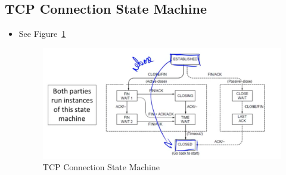 \documentclass[12pt]{ctexart}   %
\begin{document}
	\subsection{TCP Connection State Machine}
	\begin{itemize}
		 \item See Figure~\ref{fig:6-4-3}
		  
		 \begin{figure}[h!] %
		\centering
		 \includegraphics[scale=0.7]{images/6-4-3}
		\caption{  TCP Connection State Machine }
		 \label{fig:6-4-3}
		 \end{figure}
	\end{itemize}
	
\end{document}
